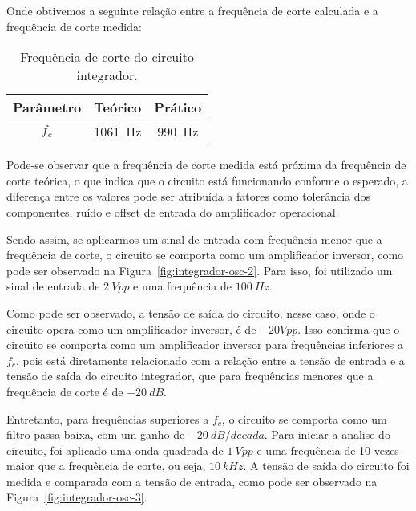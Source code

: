 
Onde obtivemos a seguinte relação entre a frequência de corte calculada e a frequência de corte medida:

\begin{table}[H]
    \centering
    \caption{Frequência de corte do circuito integrador.}
    \label{tab:resultados-integrador}
    \begin{tabular}{|c|c|c|}
        \hline
        \textbf{Parâmetro} & \textbf{Teórico} & \textbf{Prático} \\ \hline
        $f_c$             & 1061~Hz         & 990~Hz          \\ \hline
    \end{tabular}
\end{table}

Pode-se observar que a frequência de corte medida está próxima da frequência de corte teórica, o que indica que o circuito está funcionando conforme o esperado, a diferença entre os valores pode ser atribuída a fatores como tolerância dos componentes, ruído e offset de entrada do amplificador operacional.

Sendo assim, se aplicarmos um sinal de entrada com frequência menor que a frequência de corte, o circuito se comporta como um amplificador inversor, como pode ser observado na Figura~\ref{fig:integrador-osc-2}. Para isso, foi utilizado um sinal de entrada de $2~Vpp$ e uma frequência de $100~Hz$.


Como pode ser observado, a tensão de saída do circuito, nesse caso, onde o circuito opera como um amplificador inversor, é de $-20Vpp$. Isso confirma que o circuito se comporta como um amplificador inversor para frequências inferiores a $f_c$, pois está diretamente relacionado com a relação entre a tensão de entrada e a tensão de saída do circuito integrador, que para frequências menores que a frequência de corte é de $-20~dB$.

Entretanto, para frequências superiores a $f_c$, o circuito se comporta como um filtro passa-baixa, com um ganho de $-20~dB/decada$. Para iniciar a analise do circuito, foi aplicado uma onda quadrada de $1~Vpp$ e uma frequência de 10 vezes maior que a frequência de corte, ou seja, $10~kHz$. A tensão de saída do circuito foi medida e comparada com a tensão de entrada, como pode ser observado na Figura~\ref{fig:integrador-osc-3}.

